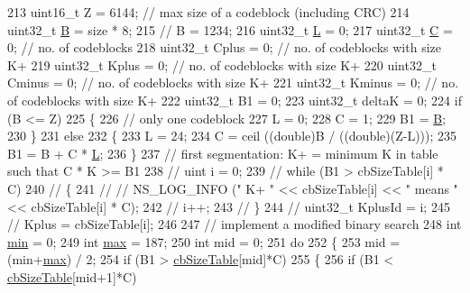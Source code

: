\begin{DoxyCode}
213   uint16\_t Z = 6144; \textcolor{comment}{// max size of a codeblock (including CRC)}
214   uint32\_t \hyperlink{generate__test__data__lte__sinr_8m_abccb2cfa2bf43e135bc0e10740453f8c}{B} = size * 8;
215 \textcolor{comment}{//   B = 1234;}
216   uint32\_t \hyperlink{loss__ITU1411__NLOS__over__rooftop_8m_a0f93e2c2e7c447b4dfc5bcac7e346da1}{L} = 0;
217   uint32\_t \hyperlink{generate__test__data__lte__sinr_8m_ae24bb667d5023e5aaa1e71c3a15e447e}{C} = 0; \textcolor{comment}{// no. of codeblocks}
218   uint32\_t Cplus = 0; \textcolor{comment}{// no. of codeblocks with size K+}
219   uint32\_t Kplus = 0; \textcolor{comment}{// no. of codeblocks with size K+}
220   uint32\_t Cminus = 0; \textcolor{comment}{// no. of codeblocks with size K+}
221   uint32\_t Kminus = 0; \textcolor{comment}{// no. of codeblocks with size K+}
222   uint32\_t B1 = 0;
223   uint32\_t deltaK = 0;
224   \textcolor{keywordflow}{if} (B <= Z)
225     \{
226       \textcolor{comment}{// only one codeblock}
227       L = 0;
228       C = 1;
229       B1 = \hyperlink{generate__test__data__lte__sinr_8m_abccb2cfa2bf43e135bc0e10740453f8c}{B};
230     \}
231   \textcolor{keywordflow}{else}
232     \{
233       L = 24;
234       C = ceil ((\textcolor{keywordtype}{double})B / ((\textcolor{keywordtype}{double})(Z-L)));
235       B1 = B + C * \hyperlink{loss__ITU1411__NLOS__over__rooftop_8m_a0f93e2c2e7c447b4dfc5bcac7e346da1}{L};
236     \}
237   \textcolor{comment}{// first segmentation: K+ = minimum K in table such that C * K >= B1}
238 \textcolor{comment}{//   uint i = 0;}
239 \textcolor{comment}{//   while (B1 > cbSizeTable[i] * C)}
240 \textcolor{comment}{//     \{}
241 \textcolor{comment}{// //       NS\_LOG\_INFO (" K+ " << cbSizeTable[i] << " means " << cbSizeTable[i] * C);}
242 \textcolor{comment}{//       i++;}
243 \textcolor{comment}{//     \}}
244 \textcolor{comment}{//   uint32\_t KplusId = i;}
245 \textcolor{comment}{//   Kplus = cbSizeTable[i];}
246 
247   \textcolor{comment}{// implement a modified binary search}
248   \textcolor{keywordtype}{int} \hyperlink{80211b_8c_ac6afabdc09a49a433ee19d8a9486056d}{min} = 0;
249   \textcolor{keywordtype}{int} \hyperlink{80211b_8c_affe776513b24d84b39af8ab0930fef7f}{max} = 187;
250   \textcolor{keywordtype}{int} mid = 0;
251   \textcolor{keywordflow}{do}
252     \{
253       mid = (min+\hyperlink{80211b_8c_affe776513b24d84b39af8ab0930fef7f}{max}) / 2;
254       \textcolor{keywordflow}{if} (B1 > \hyperlink{namespacens3_a14a1917c5d5a089d32d5d29e3c380ab9}{cbSizeTable}[mid]*C)
255         \{
256           \textcolor{keywordflow}{if} (B1 < \hyperlink{namespacens3_a14a1917c5d5a089d32d5d29e3c380ab9}{cbSizeTable}[mid+1]*C)

\end{DoxyCode}
